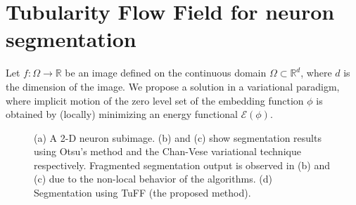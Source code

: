 \section{Tubularity Flow Field for neuron segmentation}
Let $f:\Omega \rightarrow \mathbb{R}$ be an image defined on the continuous domain $\Omega \subset \mathbb{R}^d$, where $d$ is the dimension of the image. We propose a solution in a variational paradigm, where implicit motion of the zero level set of the embedding function $\phi$ is obtained by (locally) minimizing an energy functional $\mathcal{E}(\phi)$. 
\begin{figure}[t]
\centering
{}

\caption[Global segmentation of neurites]{(a) A 2-D neuron subimage. (b) and (c) show segmentation results using Otsu's method and the Chan-Vese variational technique respectively. Fragmented segmentation output is observed in (b) and (c) due to the non-local behavior of the algorithms. (d) Segmentation using TuFF (the proposed method).}
\label{fig:CV_compare}
\end{figure}
